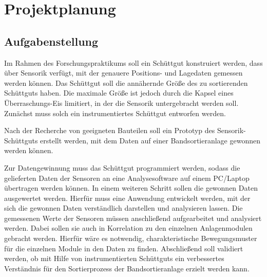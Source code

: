 \section{Projektplanung}

\subsection{Aufgabenstellung}
 
Im Rahmen des Forschungspraktikums soll ein Schüttgut konstruiert werden, dass über Sensorik verfügt, mit der genauere Positions- und Lagedaten gemessen werden können. Das Schüttgut soll die annähernde Größe des zu sortierenden Schüttguts haben. Die maximale Größe ist jedoch durch die Kapsel eines Überraschungs-Eis limitiert, in der die Sensorik untergebracht werden soll. Zunächst muss solch ein instrumentiertes Schüttgut entworfen werden.
 
Nach der Recherche von geeigneten Bauteilen soll ein Prototyp des Sensorik-Schüttguts erstellt werden, mit dem Daten auf einer Bandsortieranlage gewonnen werden können.

Zur Datengewinnung muss das Schüttgut programmiert werden, sodass die gelieferten Daten der Sensoren an eine Analysesoftware auf einem  PC/Laptop übertragen werden können. In einem weiteren Schritt sollen die gewonnen Daten ausgewertet werden. Hierfür muss eine Anwendung entwickelt werden, mit der sich die gewonnen Daten verständlich darstellen und analysieren lassen. Die gemessenen Werte der Sensoren müssen anschließend aufgearbeitet und analysiert werden. Dabei sollen sie auch in Korrelation zu den einzelnen Anlagenmodulen gebracht werden. Hierfür wäre es notwendig, charakteristische Bewegungsmuster für die einzelnen Module in den Daten zu finden. 
Abschließend soll validiert werden, ob mit Hilfe von instrumentierten Schüttguts ein verbessertes Verständnis für den Sortierprozess der Bandsortieranlage erzielt werden kann.

